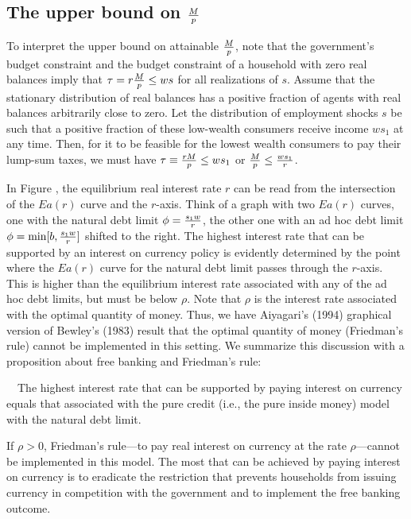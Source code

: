 \subsection{The upper bound on ${M \over p}$}
  To interpret the upper  bound on attainable ${M \over p}$, note that
the government's budget constraint and the budget constraint
of a  household with zero real balances  imply
that $ \tau  = r  {M \over p} \leq  w s $ for all realizations
of $s$.    Assume that the stationary distribution
of real balances has a positive fraction
of agents with real balances arbitrarily close to zero.   Let the
distribution of employment shocks $s$  be such that a positive
fraction of these low-wealth consumers receive income $w s_1$ at any
time.   Then, for it to be feasible for the lowest wealth
consumers to pay their lump-sum taxes, we must
have $\tau \equiv {r M \over p} \leq w s_1$ or
 $ {M \over p} \leq { w s_1 \over r} $.



In Figure , the equilibrium real interest
rate $r$ can be read from the intersection of the $E  a(r)$ curve and
the $r$-axis.  Think of a graph with two $E a(r)$ curves, one with the
natural debt limit $\phi = {s_1 w \over r}$, the other one with an
ad hoc debt limit $\phi = \min[b, {s_1 w \over r}]$ shifted to the
right.  The highest interest rate that can be supported by an
interest on currency policy is evidently determined by the point where
the $E a(r)$ curve for the natural debt limit passes through the $r$-axis.
This is higher than the equilibrium interest rate associated with any  of
the ad hoc debt limits, but must be below $\rho$.  Note that $\rho$ is
the interest rate associated with the  optimal quantity of money.
Thus, we have Aiyagari's (1994) graphical version of Bewley's (1983) result
that the optimal quantity of money (Friedman's rule) cannot be implemented
in this setting.
\medskip
We summarize this discussion with a proposition about free banking and
Friedman's rule:

\medskip
\medskip{}
\ \   The highest interest rate that can be supported by paying interest
on currency equals that associated with the pure credit (i.e., the pure inside money)
model with the natural debt limit.

\medskip

 If $\rho >0$, Friedman's rule---to pay real interest on
currency at the rate $\rho$---cannot be implemented in this
model.   The most that can be achieved by paying interest
on currency   is to
eradicate the restriction  that prevents households from
issuing currency in competition with the government and
to implement the free banking outcome.

